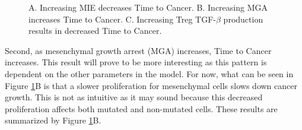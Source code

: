 \documentclass{article}
\begin{document}
\begin{figure}[H]
\center
{}
\caption{A. Increasing MIE decreases Time to Cancer. 
B. Increasing MGA increases Time to Cancer.
C. Increasing Treg TGF-$\beta$ production results in decreased Time to Cancer.
\newline
}
\label{fig:FirstSurvivalCurves}
\end{figure}

Second, as mesenchymal growth arrest (MGA) increases, Time to Cancer increases.
This result will prove to be more interesting as this pattern is dependent on the other parameters in the model.
For now, what can be seen in Figure \ref{fig:FirstSurvivalCurves}B is that a slower proliferation for mesenchymal cells slows down cancer growth.
This is not as intuitive as it may sound because this decreased proliferation affects both mutated and non-mutated cells.
These results are summarized by Figure \ref{fig:FirstSurvivalCurves}B.
\end{document}
